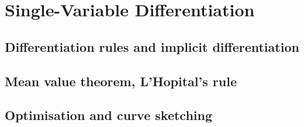 
\section{Single-Variable Differentiation}

\subsection{Differentiation rules and implicit differentiation}


\subsection{Mean value theorem, L'Hopital's rule}


\subsection{Optimisation and curve sketching}

